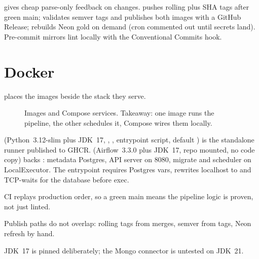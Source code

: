  gives cheap parse-only feedback on  changes.  pushes rolling plus SHA tags after green main;  validates semver tags and publishes both images with a GitHub Release;  rebuilds Neon gold on demand (cron commented out until secrets land). Pre-commit mirrors lint locally with the Conventional Commits hook.

\section{Docker}

 places the images beside the stack they serve.

\begin{figure}[tbp]
\centering

\caption{Images and Compose services. Takeaway: one image runs the pipeline, the other schedules it, Compose wires them locally.}
\label{fig:docker}
\end{figure}

 (Python~3.12-slim plus JDK~17, , , entrypoint script, default ) is the standalone runner published to GHCR.  (Airflow~3.3.0 plus JDK~17, repo mounted, no code copy) backs : metadata Postgres, API server on 8080, migrate and scheduler on LocalExecutor. The entrypoint requires Postgres vars, rewrites localhost to  and TCP-waits for the database before exec.

\begin{keybox}
\item CI replays production order, so a green main means the pipeline logic is proven, not just linted.
\item Publish paths do not overlap: rolling tags from merges, semver from tags, Neon refresh by hand.
\item JDK~17 is pinned deliberately; the Mongo connector is untested on JDK~21.
\end{keybox}
